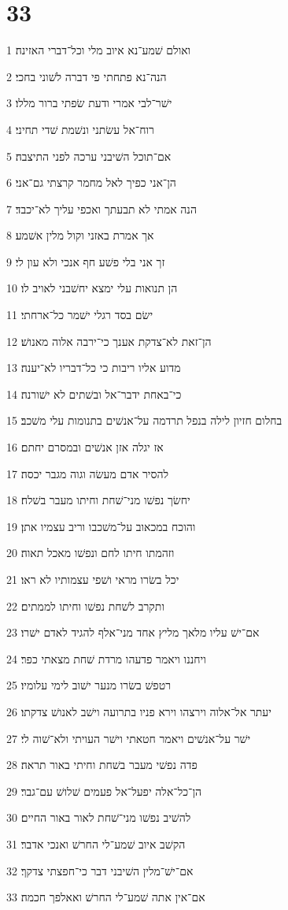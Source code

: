 \chapter{33}

\par 1 ואולם שׁמע־נא איוב מלי וכל־דברי האזינה׃
\par 2 הנה־נא פתחתי פי דברה לשׁוני בחכי׃
\par 3 ישׁר־לבי אמרי ודעת שׂפתי ברור מללו׃
\par 4 רוח־אל עשׂתני ונשׁמת שׁדי תחיני׃
\par 5 אם־תוכל השׁיבני ערכה לפני התיצבה׃
\par 6 הן־אני כפיך לאל מחמר קרצתי גם־אני׃
\par 7 הנה אמתי לא תבעתך ואכפי עליך לא־יכבד׃
\par 8 אך אמרת באזני וקול מלין אשׁמע׃
\par 9 זך אני בלי פשׁע חף אנכי ולא עון לי׃
\par 10 הן תנואות עלי ימצא יחשׁבני לאויב לו׃
\par 11 ישׂם בסד רגלי ישׁמר כל־ארחתי׃
\par 12 הן־זאת לא־צדקת אענך כי־ירבה אלוה מאנושׁ׃
\par 13 מדוע אליו ריבות כי כל־דבריו לא־יענה׃
\par 14 כי־באחת ידבר־אל ובשׁתים לא ישׁורנה׃
\par 15 בחלום חזיון לילה בנפל תרדמה על־אנשׁים בתנומות עלי משׁכב׃
\par 16 אז יגלה אזן אנשׁים ובמסרם יחתם׃
\par 17 להסיר אדם מעשׂה וגוה מגבר יכסה׃
\par 18 יחשׂך נפשׁו מני־שׁחת וחיתו מעבר בשׁלח׃
\par 19 והוכח במכאוב על־משׁכבו וריב עצמיו אתן׃
\par 20 וזהמתו חיתו לחם ונפשׁו מאכל תאוה׃
\par 21 יכל בשׂרו מראי ושׁפי עצמותיו לא ראו׃
\par 22 ותקרב לשׁחת נפשׁו וחיתו לממתים׃
\par 23 אם־ישׁ עליו מלאך מליץ אחד מני־אלף להגיד לאדם ישׁרו׃
\par 24 ויחננו ויאמר פדעהו מרדת שׁחת מצאתי כפר׃
\par 25 רטפשׁ בשׂרו מנער ישׁוב לימי עלומיו׃
\par 26 יעתר אל־אלוה וירצהו וירא פניו בתרועה וישׁב לאנושׁ צדקתו׃
\par 27 ישׁר על־אנשׁים ויאמר חטאתי וישׁר העויתי ולא־שׁוה לי׃
\par 28 פדה נפשׁי מעבר בשׁחת וחיתי באור תראה׃
\par 29 הן־כל־אלה יפעל־אל פעמים שׁלושׁ עם־גבר׃
\par 30 להשׁיב נפשׁו מני־שׁחת לאור באור החיים׃
\par 31 הקשׁב איוב שׁמע־לי החרשׁ ואנכי אדבר׃
\par 32 אם־ישׁ־מלין השׁיבני דבר כי־חפצתי צדקך׃
\par 33 אם־אין אתה שׁמע־לי החרשׁ ואאלפך חכמה׃

